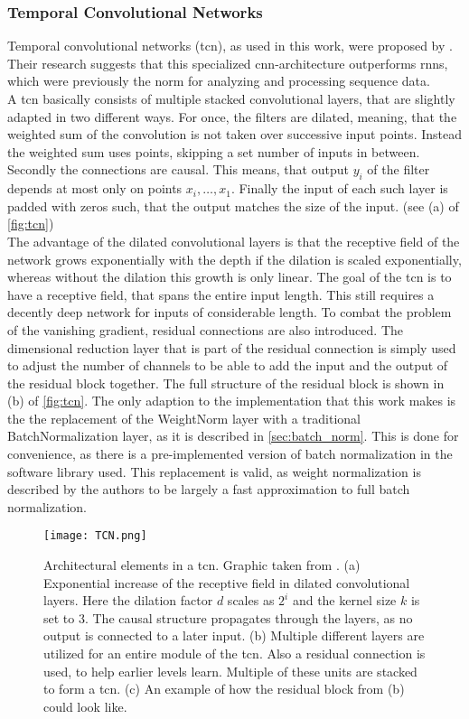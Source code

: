 \subsubsection{Temporal Convolutional Networks}\label{sec:tcn}
Temporal convolutional networks (\gls{tcn}), as used in this work, were proposed by \cite{tcn_paper}. Their research suggests that this specialized \gls{cnn}-architecture outperforms \gls{rnns}, which were previously the norm for analyzing and processing sequence data.\\
A \gls{tcn} basically consists of multiple stacked convolutional layers, that are slightly adapted in two different ways. For once, the filters are dilated, meaning, that the weighted sum of the convolution is not taken over successive input points. Instead the weighted sum uses points, skipping a set number of inputs in between. Secondly the connections are causal. This means, that output $y_i$ of the filter depends at most only on points $x_i, \dotsc,x_1$. Finally the input of each such layer is padded with zeros such, that the output matches the size of the input. (see (a) of \autoref{fig:tcn})\\
The advantage of the dilated convolutional layers is that the receptive field of the network grows exponentially with the depth if the dilation is scaled exponentially, whereas without the dilation this growth is only linear. The goal of the \gls{tcn} is to have a receptive field, that spans the entire input length. This still requires a decently deep network for inputs of considerable length. To combat the problem of the vanishing gradient, residual connections are also introduced. The dimensional reduction layer that is part of the residual connection is simply used to adjust the number of channels to be able to add the input and the output of the residual block together. The full structure of the residual block is shown in (b) of \autoref{fig:tcn}. The only adaption to the implementation that this work makes is the the replacement of the WeightNorm layer with a traditional BatchNormalization layer, as it is described in \autoref{sec:batch_norm}. This is done for convenience, as there is a pre-implemented version of batch normalization in the software library used. This replacement is valid, as weight normalization is described by the authors to be largely a fast approximation to full batch normalization. \cite{weigth_norm_invention}
\begin{figure}
\centering
\texttt{[image: TCN.png]}
\caption[TCN structure]{Architectural elements in a \gls{tcn}. Graphic taken from \cite{tcn_paper}. (a) Exponential increase of the receptive field in dilated convolutional layers. Here the dilation factor $d$ scales as $2^i$ and the kernel size $k$ is set to $3$. The causal structure propagates through the layers, as no output is connected to a later input. (b) Multiple different layers are utilized for an entire module of the \gls{tcn}. Also a residual connection is used, to help earlier levels learn. Multiple of these units are stacked to form a \gls{tcn}. (c) An example of how the residual block from (b) could look like.}\label{fig:tcn}
\end{figure}


